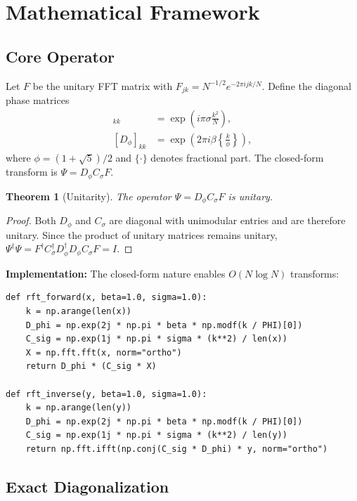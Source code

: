 \documentclass[11pt,a4paper]{article}
\newtheorem{theorem}{Theorem}
\begin{document}
\section{Mathematical Framework}

\subsection{Core Operator}
Let $F$ be the unitary FFT matrix with $F_{jk} = N^{-1/2} e^{-2\pi i jk/N}$. Define the diagonal phase matrices
\begin{align}
[C_\sigma]_{kk} &= \exp\left(i\pi\sigma \frac{k^2}{N}\right), \\
[D_\phi]_{kk} &= \exp\left(2\pi i \beta \left\{\frac{k}{\phi}\right\}\right),
\end{align}
where $\phi = (1+\sqrt{5})/2$ and $\{\cdot\}$ denotes fractional part. The closed-form transform is $\Psi = D_\phi C_\sigma F$.

\begin{theorem}[Unitarity]
The operator $\Psi = D_\phi C_\sigma F$ is unitary.
\end{theorem}

\begin{proof}
Both $D_\phi$ and $C_\sigma$ are diagonal with unimodular entries and are therefore unitary. Since the product of unitary matrices remains unitary, $\Psi^\dagger\Psi = F^\dagger C_\sigma^\dagger D_\phi^\dagger D_\phi C_\sigma F = I$.
\end{proof}

\textbf{Implementation:} The closed-form nature enables $O(N \log N)$ transforms:
\begin{lstlisting}[caption={Closed-form Φ-RFT (Python)},label={lst:closed}]
def rft_forward(x, beta=1.0, sigma=1.0):
    k = np.arange(len(x))
    D_phi = np.exp(2j * np.pi * beta * np.modf(k / PHI)[0])
    C_sig = np.exp(1j * np.pi * sigma * (k**2) / len(x))
    X = np.fft.fft(x, norm="ortho")
    return D_phi * (C_sig * X)

def rft_inverse(y, beta=1.0, sigma=1.0):
    k = np.arange(len(y))
    D_phi = np.exp(2j * np.pi * beta * np.modf(k / PHI)[0])
    C_sig = np.exp(1j * np.pi * sigma * (k**2) / len(y))
    return np.fft.ifft(np.conj(C_sig * D_phi) * y, norm="ortho")
\end{lstlisting}

\subsection{Exact Diagonalization}
\end{document}
